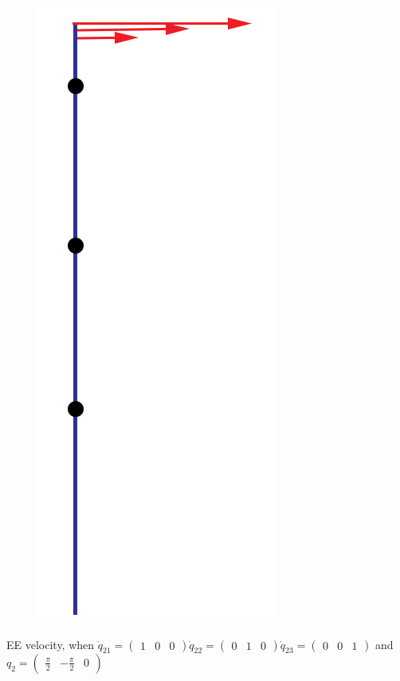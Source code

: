 \documentclass[a4paper,10pt]{article}
\begin{document}
\begin{figure}[H]
	\begin{center}
		\includegraphics[scale=0.3]{img/2_full.png}
	\end{center}
\end{figure}
EE velocity, when 
$
\dot{q}_{21} =
\begin{pmatrix}
1 & 0 & 0
\end{pmatrix}
\dot{q}_{22} =
\begin{pmatrix}
0 & 1 & 0
\end{pmatrix}
\dot{q}_{23} =
\begin{pmatrix}
0 & 0 & 1
\end{pmatrix}
$
and  
$
q_2=
\begin{pmatrix}
\frac{\pi}{2} & -\frac{\pi}{2} & 0
\end{pmatrix}
$
\end{document}

